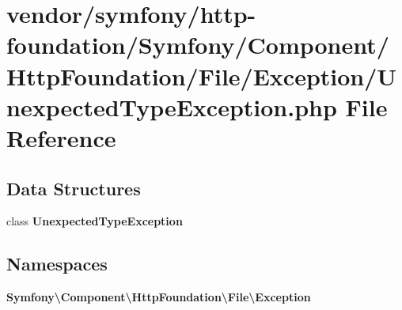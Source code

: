 \section{vendor/symfony/http-\/foundation/\+Symfony/\+Component/\+Http\+Foundation/\+File/\+Exception/\+Unexpected\+Type\+Exception.php File Reference}
\label{_unexpected_type_exception_8php}
\subsection*{Data Structures}
\begin{DoxyCompactItemize}
\item 
class {\bf Unexpected\+Type\+Exception}
\end{DoxyCompactItemize}
\subsection*{Namespaces}
\begin{DoxyCompactItemize}
\item 
 {\bf Symfony\textbackslash{}\+Component\textbackslash{}\+Http\+Foundation\textbackslash{}\+File\textbackslash{}\+Exception}
\end{DoxyCompactItemize}
